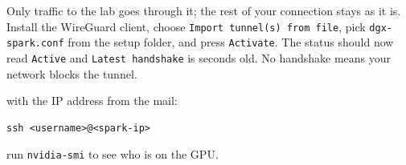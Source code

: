  Only traffic to the lab goes through it; the rest of your
connection stays as it is. Install the WireGuard client, choose
\texttt{Import tunnel(s) from file}, pick \texttt{dgx-spark.conf} from the
setup folder, and press \texttt{Activate}.
The status should now read
\texttt{Active} and \texttt{Latest handshake} is seconds old. No handshake
means your network blocks the tunnel. 

 with the IP address from the mail:
\begin{verbatim}
ssh <username>@<spark-ip>
\end{verbatim}

 run
\texttt{nvidia-smi} to see who is on the GPU.

